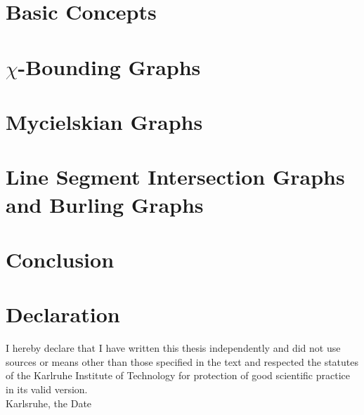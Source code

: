 \documentclass[12pt,a4paper]{scrartcl}
\theoremstyle{plain}
\theoremstyle{definition}
\numberwithin{equation}{section}
\theoremstyle{case}
\begin{document}
  \section{Basic Concepts}\label{secBC}
  
  \newpage 
  
  \section{$\chi$-Bounding Graphs}\label{secCR}
  
  \newpage
  
  \section{Mycielskian Graphs}\label{secMy}
  
  \newpage
  
  \section{Line Segment Intersection Graphs and Burling Graphs}\label{secLS}
  
  \newpage
  
  \section{Conclusion}\label{secConc}
  
  \newpage


  \listoffigures
  \newpage
 
  
  
      

  \newpage
  
  \thispagestyle{empty}


  \vspace*{8cm}


  \section*{Declaration}

I hereby declare that I have written this thesis independently and did not use sources or means other than those specified in the text
 and respected the statutes of the Karlruhe Institute of Technology for protection of good scientific practice in its valid version.
\\[2ex] 





  \noindent
Karlsruhe, the Date \\[5ex]

\end{document}
